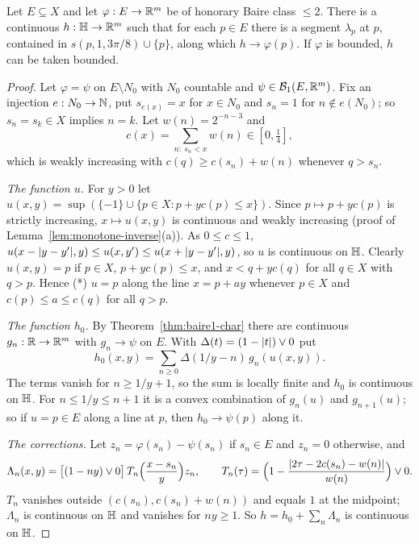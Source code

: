 \begin{theorem}\label{thm:construct-B}
Let $E\subseteq X$ and let $\varphi:E\to\mathbb{R}^m$ be of honorary Baire class $\le2$. There is a continuous $h:\mathbb{H}\to\mathbb{R}^m$ such
that for each $p\in E$ there is a segment $\lambda_p$ at $p$, contained in $s(p,1,3\pi/8)\cup\{p\}$, along which
$h\to\varphi(p)$. If $\varphi$ is bounded, $h$ can be taken bounded.
\end{theorem}
\begin{proof}
Let $\varphi=\psi$ on $E\setminus N_0$ with $N_0$ countable and $\psi\in\mathcal B_1(E,\mathbb{R}^m)$. Fix an injection
$e:N_0\to\mathbb{N}$, put $s_{e(x)}=x$ for $x\in N_0$ and $s_n=1$ for $n\notin e(N_0)$; so $s_n=s_k\in X$ implies $n=k$. Let
$w(n)=2^{-n-3}$ and
\[
c(x)=\sum_{n:\ s_n<x}w(n)\in[0,\tfrac14],
\]
which is weakly increasing with $c(q)\ge c(s_n)+w(n)$ whenever $q>s_n$.

\emph{The function $u$.} For $y>0$ let $u(x,y)=\sup(\{-1\}\cup\{p\in X:p+yc(p)\le x\})$. Since $p\mapsto p+yc(p)$ is
strictly increasing, $x\mapsto u(x,y)$ is continuous and weakly increasing (proof of Lemma~\ref{lem:monotone-inverse}(a)).
As $0\le c\le1$, $u(x-\lvert y-y'\rvert,y)\le u(x,y')\le u(x+\lvert y-y'\rvert,y)$, so $u$ is continuous on $\mathbb{H}$. Clearly
$u(x,y)=p$ if $p\in X$, $p+yc(p)\le x$, and $x<q+yc(q)$ for all $q\in X$ with $q>p$. Hence (*) $u=p$ along the line
$x=p+ay$ whenever $p\in X$ and $c(p)\le a\le c(q)$ for all $q>p$.

\emph{The function $h_0$.} By Theorem~\ref{thm:baire1-char} there are continuous $g_n:\mathbb{R}\to\mathbb{R}^m$ with $g_n\to\psi$ on $E$.
With $\Delta(t)=(1-\lvert t\rvert)\vee0$ put
\[
h_0(x,y)=\sum_{n\ge0}\Delta(1/y-n)\,g_n(u(x,y)).
\]
The terms vanish for $n\ge1/y+1$, so the sum is locally finite and $h_0$ is continuous on $\mathbb{H}$. For $n\le1/y\le n+1$ it is a
convex combination of $g_n(u)$ and $g_{n+1}(u)$; so if $u=p\in E$ along a line at $p$, then $h_0\to\psi(p)$ along it.

\emph{The corrections.} Let $z_n=\varphi(s_n)-\psi(s_n)$ if $s_n\in E$ and $z_n=0$ otherwise, and
\[
\Lambda_n(x,y)=\bigl[(1-ny)\vee0\bigr]\,T_n\Bigl(\frac{x-s_n}y\Bigr)z_n,\qquad
T_n(\tau)=\Bigl(1-\frac{\lvert 2\tau-2c(s_n)-w(n)\rvert}{w(n)}\Bigr)\vee0 .
\]
$T_n$ vanishes outside $(c(s_n),c(s_n)+w(n))$ and equals $1$ at the midpoint; $\Lambda_n$ is continuous on $\mathbb{H}$ and
vanishes for $ny\ge1$. So $h=h_0+\sum_n\Lambda_n$ is continuous on $\mathbb{H}$.


\end{proof}
